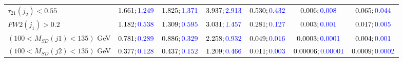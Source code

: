 \begin{landscape}
\begin{table}
\begin{tabular}{lcccccc}
			\rowcolor{black!7}$\tau_{21}(j_2)<0.55$ &$1.661;\textcolor{blue}{1.249}$ &$1.825;\textcolor{blue}{1.371}$ &$3.937;\textcolor{blue}{2.913}$&$0.530;\textcolor{blue}{0.432}$&$0.006;\textcolor{blue}{0.008}$&$0.065;\textcolor{blue}{0.044}$\\
			$FW2(j_1)>0.2$ &$1.182;\textcolor{blue}{0.538}$ &$1.309;\textcolor{blue}{0.595}$&$3.031;\textcolor{blue}{1.457}$&$0.281;\textcolor{blue}{0.127}$&$0.003;\textcolor{blue}{0.001}$&$0.017;\textcolor{blue}{0.005}$\\
			\rowcolor{black!7}$(100<M_{SD}(j1)<135)$ GeV& $0.781;\textcolor{blue}{0.289}$&$0.886;\textcolor{blue}{0.329}$&$2.258;\textcolor{blue}{0.932}$&$0.049;\textcolor{blue}{0.016}$&$0.0003;\textcolor{blue}{0.0001}$&$0.004;\textcolor{blue}{0.001}$\\
			$(100<M_{SD}(j2)<135)$ GeV &$0.377;\textcolor{blue}{0.128}$ &$0.437;\textcolor{blue}{0.152}$ &$1.209;\textcolor{blue}{0.466}$&$0.011;\textcolor{blue}{0.003}$&$0.00006;\textcolor{blue}{0.00001}$&$0.0009;\textcolor{blue}{0.0002}$\\
			\bottomrule
		\end{tabular}
	\end{table}
	

\end{landscape}
